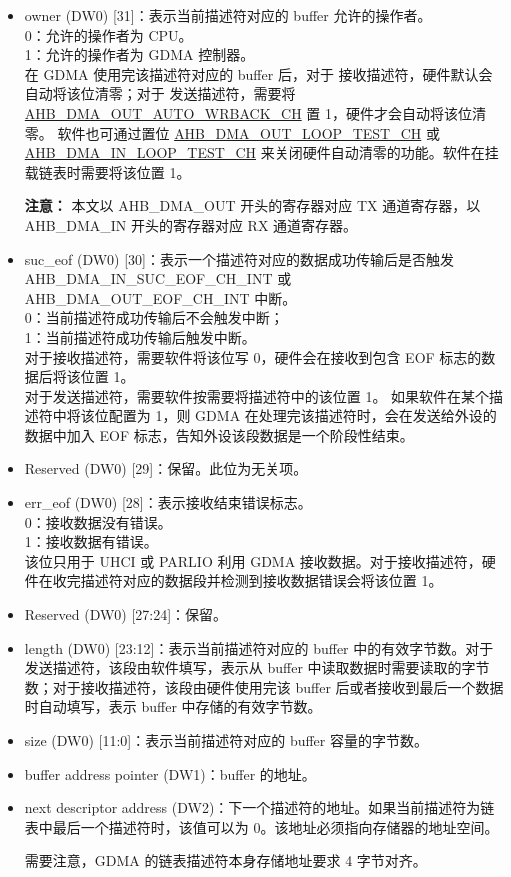 \documentclass[main\_\_CN.tex]{subfiles}
\begin{document}
\begin{itemize}
    \item owner (DW0) [31]：表示当前描述符对应的 buffer 允许的操作者。\\
    0：允许的操作者为 CPU。\\
    1：允许的操作者为 GDMA 控制器。\\
    在 GDMA 使用完该描述符对应的 buffer 后，对于 接收描述符，硬件默认会自动将该位清零；对于 发送描述符，需要将 \hyperref[fielddesc:AHBDMAOUTAUTOWRBACKCHN]{AHB\_DMA\_OUT\_AUTO\_WRBACK\_CH} 置 1，硬件才会自动将该位清零。 软件也可通过置位 \hyperref[fielddesc:AHBDMAOUTLOOPTESTCHN]{AHB\_DMA\_OUT\_LOOP\_TEST\_CH} 或 \hyperref[fielddesc:AHBDMAINLOOPTESTCHN]{AHB\_DMA\_IN\_LOOP\_TEST\_CH} 来关闭硬件自动清零的功能。软件在挂载链表时需要将该位置 1。

    {\bfseries 注意： } 本文以 AHB\_DMA\_OUT 开头的寄存器对应 TX 通道寄存器，以 AHB\_DMA\_IN 开头的寄存器对应 RX 通道寄存器。
    \item suc\_eof (DW0) [30]：表示一个描述符对应的数据成功传输后是否触发 AHB\_DMA\_IN\_SUC\_EOF\_CH\_INT 或 AHB\_DMA\_OUT\_EOF\_CH\_INT 中断。\\
    0：当前描述符成功传输后不会触发中断；\\
    1：当前描述符成功传输后触发中断。\\
    对于接收描述符，需要软件将该位写 0，硬件会在接收到包含 EOF 标志的数据后将该位置 1。\\对于发送描述符，需要软件按需要将描述符中的该位置 1。
    如果软件在某个描述符中将该位配置为 1，则 GDMA 在处理完该描述符时，会在发送给外设的数据中加入 EOF 标志，告知外设该段数据是一个阶段性结束。
    \item Reserved (DW0) [29]：保留。此位为无关项。
    \item err\_eof (DW0) [28]：表示接收结束错误标志。\\
    0：接收数据没有错误。\\
    1：接收数据有错误。\\
    该位只用于 UHCI 或 PARLIO 利用 GDMA 接收数据。对于接收描述符，硬件在收完描述符对应的数据段并检测到接收数据错误会将该位置 1。
    \item Reserved (DW0) [27:24]：保留。
    \item length (DW0) [23:12]：表示当前描述符对应的 buffer 中的有效字节数。对于发送描述符，该段由软件填写，表示从 buffer 中读取数据时需要读取的字节数；对于接收描述符，该段由硬件使用完该 buffer 后或者接收到最后一个数据时自动填写，表示 buffer 中存储的有效字节数。
    \item size (DW0) [11:0]：表示当前描述符对应的 buffer 容量的字节数。
    \item buffer address pointer (DW1)：buffer 的地址。
    \item next descriptor address (DW2)：下一个描述符的地址。如果当前描述符为链表中最后一个描述符时，该值可以为 0。该地址必须指向存储器的地址空间。
    \begin{tiplisting}
        需要注意，GDMA 的链表描述符本身存储地址要求 4 字节对齐。
    \end{tiplisting}
\end{itemize}
\end{document}
